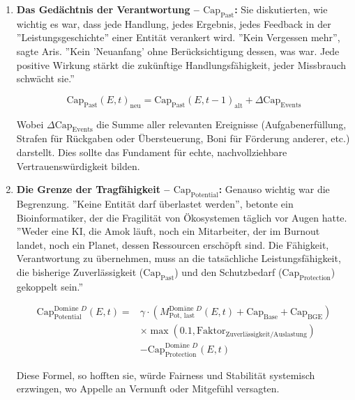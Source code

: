 \documentclass[12pt, ngerman, parskip=full]{scrartcl} %
\begin{document}
\begin{enumerate}
    \item \textbf{Das Gedächtnis der Verantwortung – $\text{Cap}_{\text{Past}}$:}
    Sie diskutierten, wie wichtig es war, dass jede Handlung, jedes Ergebnis, jedes Feedback in der ''Leistungsgeschichte'' einer Entität verankert wird. ''Kein Vergessen mehr'', sagte Aris. ''Kein 'Neuanfang' ohne Berücksichtigung dessen, was war. Jede positive Wirkung stärkt die zukünftige Handlungsfähigkeit, jeder Missbrauch schwächt sie.''

    $$ \text{Cap}_{\text{Past}}(E, t)_{\text{neu}} = \text{Cap}_{\text{Past}}(E, t-1)_{\text{alt}} + \Delta \text{Cap}_{\text{Events}} $$

    Wobei $\Delta \text{Cap}_{\text{Events}}$ die Summe aller relevanten Ereignisse (Aufgabenerfüllung, Strafen für Rückgaben oder Übersteuerung, Boni für Förderung anderer, etc.) darstellt. Dies sollte das Fundament für echte, nachvollziehbare Vertrauenswürdigkeit bilden.

    \item \textbf{Die Grenze der Tragfähigkeit – $\text{Cap}_{\text{Potential}}$:}
    Genauso wichtig war die Begrenzung. ''Keine Entität darf überlastet werden'', betonte ein Bioinformatiker, der die Fragilität von Ökosystemen täglich vor Augen hatte. ''Weder eine KI, die Amok läuft, noch ein Mitarbeiter, der im Burnout landet, noch ein Planet, dessen Ressourcen erschöpft sind. Die Fähigkeit, Verantwortung zu übernehmen, muss an die tatsächliche Leistungsfähigkeit, die bisherige Zuverlässigkeit ($\text{Cap}_{\text{Past}}$) und den Schutzbedarf ($\text{Cap}_{\text{Protection}}$) gekoppelt sein.''

    \begin{equation*}
    \begin{aligned}
    \text{Cap}_{\text{Potential}}^{\text{Domäne } D}(E, t) ={} & \gamma \cdot (M_{\text{Pot, last}}^{\text{Domäne } D}(E, t) + \text{Cap}_{\text{Base}} + \text{Cap}_{\text{BGE}}) \\
    & \times \max(0.1, \text{Faktor}_{\text{Zuverlässigkeit/Auslastung}}) \\
    & - \text{Cap}_{\text{Protection}}^{\text{Domäne } D}(E, t)
    \end{aligned}
    \end{equation*}

    Diese Formel, so hofften sie, würde Fairness und Stabilität systemisch erzwingen, wo Appelle an Vernunft oder Mitgefühl versagten.
\end{enumerate}
\end{document}
